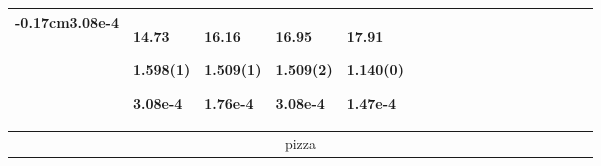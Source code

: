 \begin{longtable}{|p{0.01cm}|p{0.25cm}p{0.25cm}p{0.25cm}p{0.25cm}p{0.25cm}p{0.25cm}p{0.25cm}p{0.25cm}p{0.25cm}p{0.25cm}p{0.25cm}p{0.25cm}p{0.25cm}p{0.25cm}p{0.25cm}p{0.25cm}p{0.25cm}|}
{-0.17cm}3.08e-4}} & \par{\tiny \parbox{1cm}{\hspace{-0.17cm}14.73}}\par{\tiny \parbox{1cm}{\hspace{-0.17cm}1.598(1)}}\par{\tiny \parbox{1cm}{\hspace{-0.17cm}3.08e-4}} & \par{\tiny \parbox{1cm}{\hspace{-0.17cm}16.16}}\par{\tiny \parbox{1cm}{\hspace{-0.17cm}1.509(1)}}\par{\tiny \parbox{1cm}{\hspace{-0.17cm}1.76e-4}} & \par{\tiny \parbox{1cm}{\hspace{-0.17cm}16.95}}\par{\tiny \parbox{1cm}{\hspace{-0.17cm}1.509(2)}}\par{\tiny \parbox{1cm}{\hspace{-0.17cm}3.08e-4}} & \par{\tiny \parbox{1cm}{\hspace{-0.17cm}17.91}}\par{\tiny \parbox{1cm}{\hspace{-0.17cm}1.140(0)}}\par{\tiny \parbox{1cm}{\hspace{-0.17cm}1.47e-4}}\\
\hline\hline \multicolumn{18}{|c|}{\tiny{pizza}} \\

\end{longtable}

